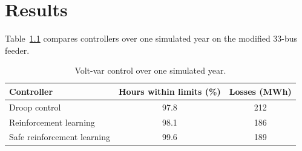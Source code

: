 \chapter{Results}
\label{ch:results}

Table~\ref{tab:vvc} compares controllers over one simulated year on the modified 33-bus feeder.

\begin{table}[htbp]
  \centering
  \caption{Volt-var control over one simulated year.}
  \label{tab:vvc}
  \begin{tabular}{lcc}
    \toprule
    Controller & Hours within limits (\%) & Losses (MWh) \\
    \midrule
    Droop control                 & 97.8 & 212 \\
    Reinforcement learning        & 98.1 & 186 \\
    Safe reinforcement learning   & 99.6 & 189 \\
    \bottomrule
  \end{tabular}
\end{table}
